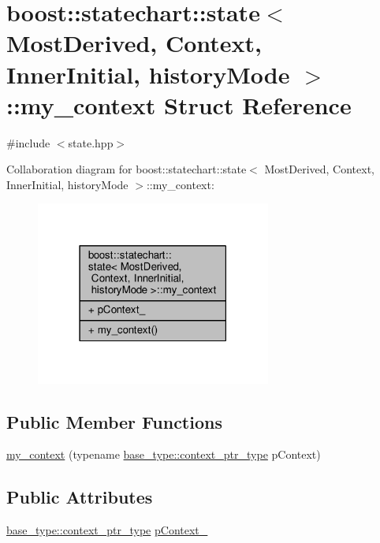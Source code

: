 \hypertarget{structboost_1_1statechart_1_1state_1_1my__context}{}\section{boost\+:\+:statechart\+:\+:state$<$ Most\+Derived, Context, Inner\+Initial, history\+Mode $>$\+:\+:my\+\_\+context Struct Reference}
\label{structboost_1_1statechart_1_1state_1_1my__context}


{\ttfamily \#include $<$state.\+hpp$>$}



Collaboration diagram for boost\+:\+:statechart\+:\+:state$<$ Most\+Derived, Context, Inner\+Initial, history\+Mode $>$\+:\+:my\+\_\+context\+:
\nopagebreak
\begin{figure}[H]
\begin{center}
\leavevmode
\includegraphics[width=219pt]{structboost_1_1statechart_1_1state_1_1my__context__coll__graph}
\end{center}
\end{figure}
\subsection*{Public Member Functions}
\begin{DoxyCompactItemize}
\item 
\mbox{\hyperlink{structboost_1_1statechart_1_1state_1_1my__context_ada86fa52dbe35f9e696b6432f0b103e3}{my\+\_\+context}} (typename \mbox{\hyperlink{classboost_1_1statechart_1_1simple__state_ac7e361322d53b3f57976ff23056b59e7}{base\+\_\+type\+::context\+\_\+ptr\+\_\+type}} p\+Context)
\end{DoxyCompactItemize}
\subsection*{Public Attributes}
\begin{DoxyCompactItemize}
\item 
\mbox{\hyperlink{classboost_1_1statechart_1_1simple__state_ac7e361322d53b3f57976ff23056b59e7}{base\+\_\+type\+::context\+\_\+ptr\+\_\+type}} \mbox{\hyperlink{structboost_1_1statechart_1_1state_1_1my__context_a401a0168baaefd86a2673386f00e2b7b}{p\+Context\+\_\+}}
\end{DoxyCompactItemize}



